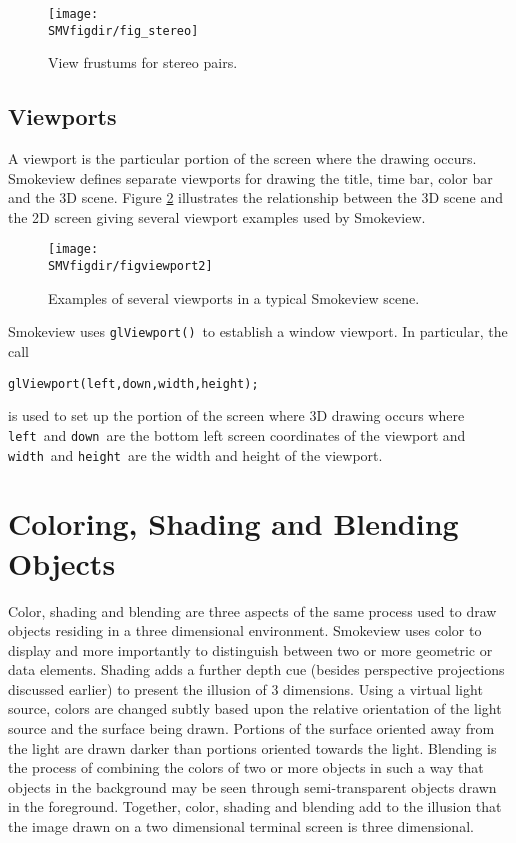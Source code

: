 \documentclass[11pt,twoside]{book}
\begin{document}
\begin{figure}[bph]
\begin{center}
\texttt{[image: \\SMVfigdir/fig\_stereo]}
\end{center}
\caption{View frustums for stereo pairs.}
 \label{figstereo}
\end{figure}

\subsection{Viewports}
A viewport is the particular portion of the screen where the
drawing occurs.  Smokeview defines separate viewports for drawing
the title, time bar, color bar and the 3D scene.  Figure
\ref{figviewports} illustrates the relationship between the 3D
scene and the 2D screen giving several viewport examples used by
Smokeview.
\begin{figure}[bph]
\begin{center}
\texttt{[image: \\SMVfigdir/figviewport2]}
\end{center}
\caption{Examples of several viewports in a typical Smokeview scene.}
 \label{figviewports}
\end{figure}

Smokeview uses {\tt glViewport()}\ to establish a window viewport.  In particular, the call
\begin{lstlisting}
glViewport(left,down,width,height);
\end{lstlisting}
is used to set up the portion of the screen where 3D drawing occurs where {\tt left}\
and {\tt down}\ are the bottom left screen coordinates of the viewport and {\tt width}\
and {\tt height}\ are the width and height of the viewport.

%
%

\section{Coloring, Shading and Blending Objects}
Color, shading and blending are three aspects of the same process
used to draw objects residing in a three dimensional environment.
Smokeview uses color to display and more importantly to
distinguish between two or more geometric or data elements.
Shading adds a further depth cue (besides perspective projections
discussed earlier) to present the illusion of 3 dimensions.  Using
a virtual light source, colors are changed subtly based upon the
relative orientation of the light source and the surface being
drawn.  Portions of the surface oriented away from the light are
drawn darker than portions oriented towards the light.  Blending
is the process of combining the colors of two or more objects in
such a way that objects in the background may be seen through
semi-transparent objects drawn in the foreground.  Together,
color, shading and blending add to the illusion that the image
drawn on a two dimensional terminal screen is three dimensional.
\end{document}
